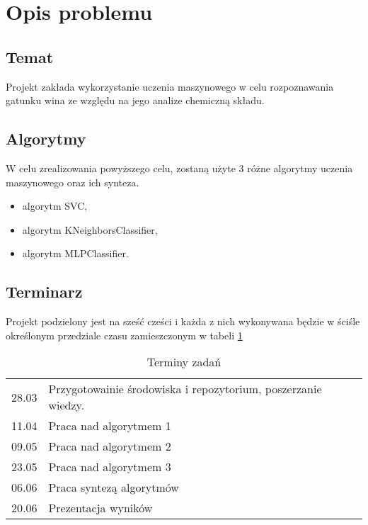 \documentclass[12pt,a4paper]{article}
\begin{document}
\pdfpageheight   297mm
\pdfpagewidth    210mm

\StronaTytulowa
\SpisTresci

\pagebreak

\section{Opis problemu}
  \subsection{Temat}
  Projekt zakłada wykorzystanie uczenia maszynowego w celu rozpoznawania gatunku wina ze względu na jego analize chemiczną składu.

  \subsection{Algorytmy}
  W celu zrealizowania powyższego celu, zostaną użyte 3 różne algorytmy uczenia maszynowego oraz ich synteza.

  \begin{itemize}
    \item algorytm SVC,
    \item algorytm KNeighborsClassifier,
    \item algorytm MLPClassifier.
  \end{itemize}

  \subsection{Terminarz}
  Projekt podzielony jest na sześć cześci i każda z nich wykonywana będzie w ściśle określonym przedziale czasu zamieszczonym w tabeli \ref{terminarz}

  \begin{table}[h!]
    \centering
    \begin{tabular}{ r | l }
    28.03 & Przygotowainie środowiska i repozytorium, poszerzanie wiedzy. \\
    11.04 & Praca nad algorytmem 1 \\
    09.05 & Praca nad algorytmem 2 \\
    23.05 & Praca nad algorytmem 3 \\
    06.06 & Praca syntezą algorytmów \\
    20.06 & Prezentacja wyników \\
    \end{tabular}
    \label{terminarz}
    \caption{Terminy zadań}
  \end{table}
\end{document}
